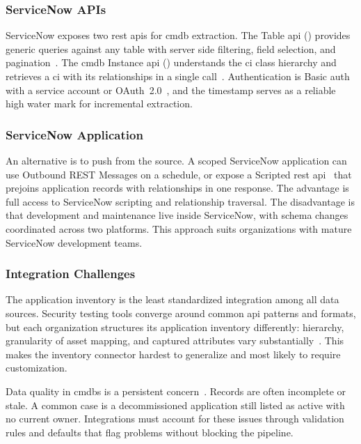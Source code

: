 \subsubsection{ServiceNow APIs}

ServiceNow exposes two \gls{rest} \glspl{api} for \gls{cmdb} extraction. The Table \gls{api} () provides generic queries against any table with server side filtering, field selection, and pagination~\cite{ServiceNowTableAPI2024}. The \gls{cmdb} Instance \gls{api} () understands the \gls{ci} class hierarchy and retrieves a \gls{ci} with its relationships in a single call~\cite{ServiceNowCMDB2024}. Authentication is Basic auth with a service account or OAuth~2.0~\cite{ServiceNowRESTAuth2024}, and the  timestamp serves as a reliable high water mark for incremental extraction.

\subsubsection{ServiceNow Application}

An alternative is to push from the source. A scoped ServiceNow application can use Outbound REST Messages on a schedule, or expose a Scripted \gls{rest} \gls{api}~\cite{ServiceNowScriptedREST2024} that prejoins application records with relationships in one response. The advantage is full access to ServiceNow scripting and relationship traversal. The disadvantage is that development and maintenance live inside ServiceNow, with schema changes coordinated across two platforms. This approach suits organizations with mature ServiceNow development teams.

\subsubsection{Integration Challenges}

The application inventory is the least standardized integration among all data sources. Security testing tools converge around common \gls{api} patterns and formats, but each organization structures its application inventory differently: hierarchy, granularity of asset mapping, and captured attributes vary substantially~\cite{AXELOS2019}. This makes the inventory connector hardest to generalize and most likely to require customization.

Data quality in \glspl{cmdb} is a persistent concern~\cite{Gartner2021CMDB}. Records are often incomplete or stale. A common case is a decommissioned application still listed as active with no current owner. Integrations must account for these issues through validation rules and defaults that flag problems without blocking the pipeline.

